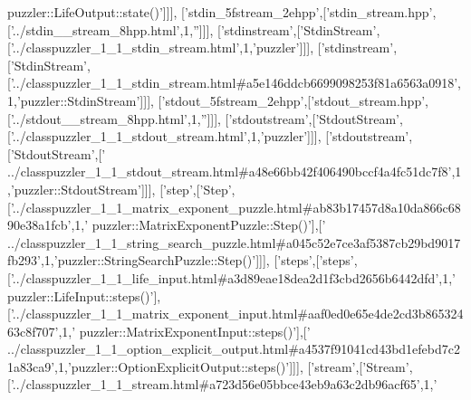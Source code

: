 \begin{DoxyCode}
{      puzzler::LifeOutput::state()'}]]],
  [\textcolor{stringliteral}{'stdin\_5fstream\_2ehpp'},[\textcolor{stringliteral}{'stdin\_stream.hpp'},[\textcolor{stringliteral}{'../stdin\_\_stream\_8hpp.html'},1,\textcolor{stringliteral}{''}]]],
  [\textcolor{stringliteral}{'stdinstream'},[\textcolor{stringliteral}{'StdinStream'},[\textcolor{stringliteral}{'../classpuzzler\_1\_1\_stdin\_stream.html'},1,\textcolor{stringliteral}{'puzzler'}]]],
  [\textcolor{stringliteral}{'stdinstream'},[\textcolor{stringliteral}{'StdinStream'},[\textcolor{stringliteral}{'../classpuzzler\_1\_1\_stdin\_stream.html#a5e146ddcb6699098253f81a6563a0918'},
      1,\textcolor{stringliteral}{'puzzler::StdinStream'}]]],
  [\textcolor{stringliteral}{'stdout\_5fstream\_2ehpp'},[\textcolor{stringliteral}{'stdout\_stream.hpp'},[\textcolor{stringliteral}{'../stdout\_\_stream\_8hpp.html'},1,\textcolor{stringliteral}{''}]]],
  [\textcolor{stringliteral}{'stdoutstream'},[\textcolor{stringliteral}{'StdoutStream'},[\textcolor{stringliteral}{'../classpuzzler\_1\_1\_stdout\_stream.html'},1,\textcolor{stringliteral}{'puzzler'}]]],
  [\textcolor{stringliteral}{'stdoutstream'},[\textcolor{stringliteral}{'StdoutStream'},[\textcolor{stringliteral}{'
      ../classpuzzler\_1\_1\_stdout\_stream.html#a48e66bb42f406490bccf4a4fc51dc7f8'},1,\textcolor{stringliteral}{'puzzler::StdoutStream'}]]],
  [\textcolor{stringliteral}{'step'},[\textcolor{stringliteral}{'Step'},[\textcolor{stringliteral}{'../classpuzzler\_1\_1\_matrix\_exponent\_puzzle.html#ab83b17457d8a10da866c6890e38a1fcb'},1,\textcolor{stringliteral}{'
      puzzler::MatrixExponentPuzzle::Step()'}],[\textcolor{stringliteral}{'
      ../classpuzzler\_1\_1\_string\_search\_puzzle.html#a045c52e7ce3af5387cb29bd9017fb293'},1,\textcolor{stringliteral}{'puzzler::StringSearchPuzzle::Step()'}]]],
  [\textcolor{stringliteral}{'steps'},[\textcolor{stringliteral}{'steps'},[\textcolor{stringliteral}{'../classpuzzler\_1\_1\_life\_input.html#a3d89eae18dea2d1f3cbd2656b6442dfd'},1,\textcolor{stringliteral}{'
      puzzler::LifeInput::steps()'}],[\textcolor{stringliteral}{'../classpuzzler\_1\_1\_matrix\_exponent\_input.html#aaf0ed0e65e4de2cd3b86532463c8f707'},1,\textcolor{stringliteral}{'
      puzzler::MatrixExponentInput::steps()'}],[\textcolor{stringliteral}{'
      ../classpuzzler\_1\_1\_option\_explicit\_output.html#a4537f91041cd43bd1efebd7c21a83ca9'},1,\textcolor{stringliteral}{'puzzler::OptionExplicitOutput::steps()'}]]],
  [\textcolor{stringliteral}{'stream'},[\textcolor{stringliteral}{'Stream'},[\textcolor{stringliteral}{'../classpuzzler\_1\_1\_stream.html#a723d56e05bbce43eb9a63c2db96acf65'},1,\textcolor{stringliteral}{'
}
\end{DoxyCode}
